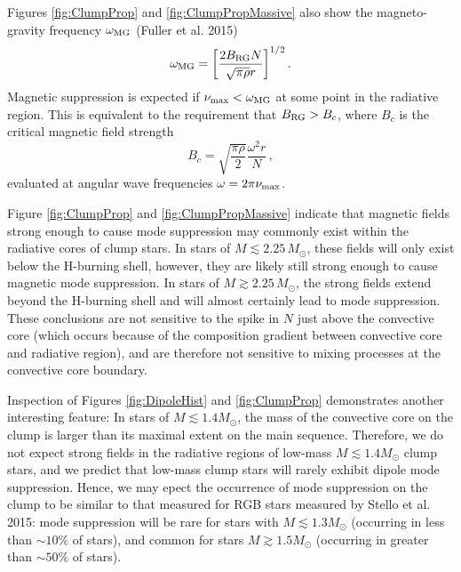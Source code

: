 Figures \ref{fig:ClumpProp} and \ref{fig:ClumpPropMassive} also show the magneto-gravity frequency $\omega_{\rm MG}$ (Fuller et al. 2015)
\begin{equation}
\label{eqn:omegaMG}
\omega_{\rm MG} = \bigg[ \frac{ 2 B_{\rm RG} N}{\sqrt{\pi \rho} r} \bigg]^{1/2} \, .
\end{equation}
Magnetic suppression is expected if $\nu_{\rm max} < \omega_{\rm MG}$ at some point in the radiative region. This is equivalent to the requirement that $B_{\rm RG} > B_c$, where $B_c$ is the critical magnetic field strength
\begin{equation}
\label{eqn:Bc}
B_c = \sqrt{ \frac{ \pi \rho}{2} } \frac{\omega^2 r}{N} \, ,
\end{equation}
evaluated at angular wave frequencies $\omega = 2 \pi \nu_{\rm max}$. 

Figure \ref{fig:ClumpProp} and \ref{fig:ClumpPropMassive} indicate that magnetic fields strong enough to cause mode suppression may commonly exist within the radiative cores of clump stars. In stars of $M \lesssim 2.25 \, M_\odot$, these fields will only exist below the H-burning shell, however, they are likely still strong enough to cause magnetic mode suppression. In stars of $M \gtrsim 2.25 \, M_\odot$, the strong fields extend beyond the H-burning shell and will almost certainly lead to mode suppression. These conclusions are not sensitive to the spike in $N$ just above the convective core (which occurs because of the composition gradient between convective core and radiative region), and are therefore not sensitive to mixing processes at the convective core boundary. 

Inspection of Figures \ref{fig:DipoleHist} and \ref{fig:ClumpProp} demonstrates another interesting feature: In stars of $M \lesssim 1.4 M_\odot$, the mass of the convective core on the clump is larger than its maximal extent on the main sequence. Therefore, we do not expect strong fields in the radiative regions of low-mass $M \lesssim 1.4 M_\odot$ clump stars, and we predict that low-mass clump stars will rarely exhibit dipole mode suppression. Hence, we may epect the occurrence of mode suppression on the clump to be similar to that measured for RGB stars measured by Stello et al. 2015: mode suppression will be rare for stars with $M \lesssim 1.3 M_\odot$ (occurring in less than $\sim \! 10 \%$ of stars), and common for stars $M \gtrsim 1.5 M_\odot$ (occurring in greater than $\sim \! 50 \%$ of stars). 



    
    
    
